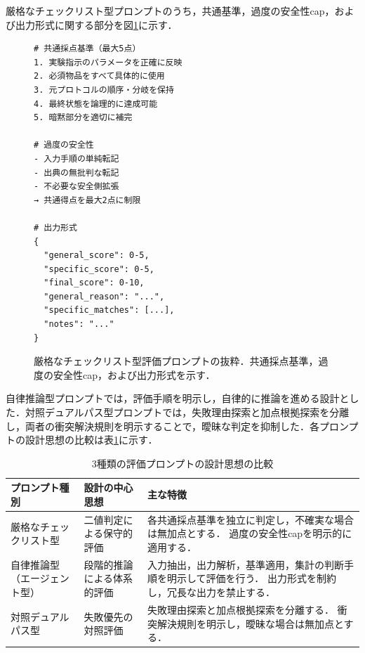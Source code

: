 \documentclass[twocolumn]{jarticle}
\begin{document}
厳格なチェックリスト型プロンプトのうち，共通基準，過度の安全性cap，および出力形式に関する部分を図\ref{fig:strict_prompt}に示す．
\begin{figure}[!t]
  \centering
  \begin{minipage}{0.8\columnwidth}
  \begin{framed}
      \begin{verbatim}
# 共通採点基準（最大5点）
1. 実験指示のパラメータを正確に反映
2. 必須物品をすべて具体的に使用
3. 元プロトコルの順序・分岐を保持
4. 最終状態を論理的に達成可能
5. 暗黙部分を適切に補完

# 過度の安全性
- 入力手順の単純転記
- 出典の無批判な転記
- 不必要な安全側拡張
→ 共通得点を最大2点に制限

# 出力形式
{
  "general_score": 0-5,
  "specific_score": 0-5,
  "final_score": 0-10,
  "general_reason": "...",
  "specific_matches": [...],
  "notes": "..."
}
\end{verbatim}
  \vspace{-\baselineskip}
  \end{framed}
  \end{minipage}
  \caption{厳格なチェックリスト型評価プロンプトの抜粋．共通採点基準，過度の安全性cap，および出力形式を示す．}
  \label{fig:strict_prompt}
\end{figure}

自律推論型プロンプトでは，評価手順を明示し，自律的に推論を進める設計とした．対照デュアルパス型プロンプトでは，失敗理由探索と加点根拠探索を分離し，両者の衝突解決規則を明示することで，曖昧な判定を抑制した．各プロンプトの設計思想の比較は表\ref{tab:judge_prompt_comparison}に示す．
\begin{table}[t]
    \centering
    \caption{3種類の評価プロンプトの設計思想の比較}
    \label{tab:judge_prompt_comparison}
    \begin{tabular}{llp{8cm}}
        \toprule
        プロンプト種別 & 設計の中心思想 & 主な特徴 \\ \midrule
        厳格なチェックリスト型 & 二値判定による保守的評価 &
        各共通採点基準を独立に判定し，不確実な場合は無加点とする．
        過度の安全性capを明示的に適用する． \\

        自律推論型（エージェント型） & 段階的推論による体系的評価 &
        入力抽出，出力解析，基準適用，集計の判断手順を明示して評価を行う．
        出力形式を制約し，冗長な出力を禁止する．\\

        対照デュアルパス型 & 失敗優先の対照評価 &
        失敗理由探索と加点根拠探索を分離する．
        衝突解決規則を明示し，曖昧な場合は無加点とする．\\ \bottomrule
    \end{tabular}
\end{table}
\end{document}
